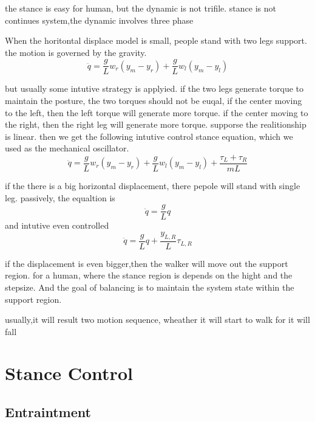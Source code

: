 the stance is easy for human, but the dynamic is not trifile.
stance is not continues system,the dynamic involves three phase

\begin{itemize}
When the horitontal displace model is small, people stand with two legs support.
the motion is governed by the gravity.
\[
\ddot{q}=\frac{g}{L}w_r(y_m-y_r)+\frac{g}{L}w_l(y_m-y_l)
\]


but usually some intutive strategy is applyied.
if the two legs generate torque to maintain the posture, the two torques should not be euqal,
if the center moving to the left, then the left torque will generate more torque.
if the center moving to the right, then the right leg will generate more torque.
supporse the realitionship is linear.
then we get the following intutive control stance equation, which we used as the mechanical oscillator.
\begin{equation}
\label{eq:stanceequation}
\ddot{q}=\frac{g}{L}w_r(y_m-y_r)+\frac{g}{L}w_l(y_m-y_l)+\frac{\tau_L+\tau_R}{mL}
\end{equation}



if the there is a big horizontal displacement, there pepole will stand with single leg.
passively, the equaltion is 
\[
\ddot{q}=\frac{g}{L}q
\]
and intutive even controlled
\begin{equation}
\label{equ:singlestand}
\ddot{q}=\frac{g}{L}q+\frac{y_{L,R}}{L}\tau_{L,R}
\end{equation}

if the displacement is even bigger,then the walker will move out the support region.
for a human, where the stance region is depends on the  hight and the stepsize.
And the goal of balancing is to maintain the system state within the support region.

usually,it will result two motion sequence, wheather it will start to walk for it will fall


\end{itemize}

\section {Stance Control}
\subsection{Entraintment}

